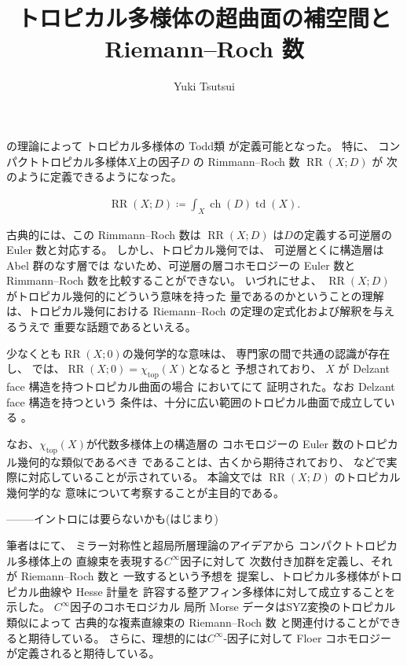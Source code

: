 \documentclass[a4paper,dvipdfmx,reqno,12pt]{amsart}
\title{トロピカル多様体の超曲面の補空間と Riemann--Roch 数}
\author[Y. Tsutsui]{Yuki Tsutsui}
\theoremstyle{definition}
\newcommand{\deq}{\coloneqq}
\newcommand{\opn}[1]{\operatorname{#1}}
\numberwithin{equation}{section}
\begin{document}
\maketitle

\cite{demedrano2023chern}の理論によって
トロピカル多様体の Todd類 が定義可能となった。
特に、
コンパクトトロピカル多様体$X$上の因子$D$ の
Rimmann--Roch 数 $\opn{RR}(X;D)$ が
次のように定義できるようになった。

\begin{align}
     \opn{RR}(X;D)\deq \int_{X}\opn{ch}(D)\opn{td}(X).
\end{align}

古典的には、この Rimmann--Roch 数は $\opn{RR}(X;D)$
は$D$の定義する可逆層の Euler 数と対応する。
しかし、トロピカル幾何では、
可逆層とくに構造層は Abel 群のなす層では
ないため、可逆層の層コホモロジーの Euler 数と
Rimmann--Roch 数を比較することができない。
いづれにせよ、
$\opn{RR}(X;D)$ がトロピカル幾何的にどういう意味を持った
量であるのかということの理解は、トロピカル幾何における
Riemann--Roch の定理の定式化および解釈を与えるうえで
重要な話題であるといえる。

少なくとも$\opn{RR}(X;0)$の幾何学的な意味は、
専門家の間で共通の認識が存在し、
\cite[Conjecture 6.13]{demedrano2023chern}
では、$\opn{RR}(X;0)=\chi_{\opn{top}}(X)$となると
予想されており、
$X$ が Delzant face 構造を持つトロピカル曲面の場合
において\cite[Theorem 6.3]{demedrano2023chern}にて
証明された。なお Delzant face 構造を持つという
条件は、十分に広い範囲のトロピカル曲面で成立している
\cite[Corollary 6.11]{demedrano2023chern}。

なお、$\chi_{\opn{top}}(X)$が代数多様体上の構造層の
コホモロジーの Euler 数のトロピカル幾何的な類似であるべき
であることは、古くから期待されており、
\cite[Corollary 2]{MR3961331}
などで実際に対応していることが示されている。
本論文では $\opn{RR}(X;D)$ のトロピカル幾何学的な
意味について考察することが主目的である。

--------イントロには要らないかも(はじまり)

筆者は\cite{tsutsui2023graded}にて、
ミラー対称性と超局所層理論のアイデアから
コンパクトトロピカル多様体上の
直線束を表現する$C^{\infty}$因子に対して
次数付き加群を定義し、それが Riemann--Roch 数と
一致するという予想\cite[Conjecture 1.2]{tsutsui2023graded}を
提案し、トロピカル多様体がトロピカル曲線や Hesse 計量を
許容する整アフィン多様体に対して成立することを示した。
$C^{\infty}$因子のコホモロジカル
局所 Morse データはSYZ変換のトロピカル類似によって
古典的な複素直線束の Riemann--Roch 数
と関連付けることができると期待している。
さらに、理想的には$C^{\infty}$-因子に対して
Floer コホモロジーが定義されると期待している。
\end{document}
